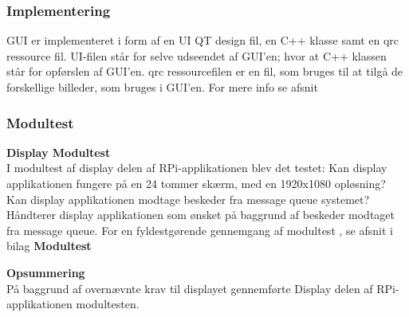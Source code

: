 \documentclass[Rapport/Rapport_main.tex]{subfiles}
\begin{document}
\subsubsection{Implementering}
GUI er implementeret i form af en UI QT design fil,  en C++  klasse samt en qrc ressource fil. UI-filen står for selve udseendet af GUI'en; hvor at C++ klassen står for opførslen af GUI'en. qrc ressourcefilen er en fil, som bruges til at tilgå de forskellige billeder, som bruges i GUI'en. For mere info se afsnit 
\subsubsection{Modultest}

\textbf{Display Modultest}\\
I modultest af display delen af RPi-applikationen blev det testet:  Kan display applikationen fungere på en 24 tommer skærm, med en 1920x1080 opløsning? Kan display applikationen modtage beskeder fra message queue systemet? Håndterer display applikationen som ønsket på baggrund af beskeder modtaget fra message queue. For en fyldestgørende gennemgang af modultest , se afsnit  i bilag \textbf{Modultest}

\textbf{Opsummering}\\
På baggrund af overnævnte krav til displayet gennemførte Display delen af RPi-applikationen  modultesten.
\end{document}
